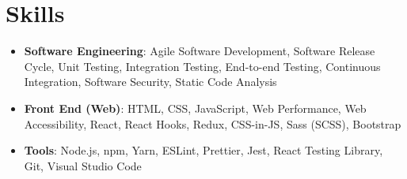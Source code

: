 \documentclass[11pt, a4paper]{article}
\newcommand{\resumeSubHeadingListStart}{\begin{itemize}[leftmargin=*]}
\newcommand{\resumeSubHeadingListEnd}{\end{itemize}}
\begin{document}



\section{Skills}
  \resumeSubHeadingListStart
    \item{
      \textbf{Software Engineering}{: Agile Software Development, Software Release Cycle, Unit Testing, Integration Testing, End-to-end Testing, Continuous Integration, Software Security, Static Code Analysis}
    }
    \item{
      \textbf{Front End (Web)}{: HTML, CSS, JavaScript, Web Performance, Web Accessibility, React, React Hooks, Redux, CSS-in-JS, Sass (SCSS), Bootstrap}
    }
    \item{
      \textbf{Tools}{: Node.js, npm, Yarn, ESLint, Prettier, Jest, React Testing Library, Git, Visual Studio Code}
    }
  \resumeSubHeadingListEnd





\end{document}
